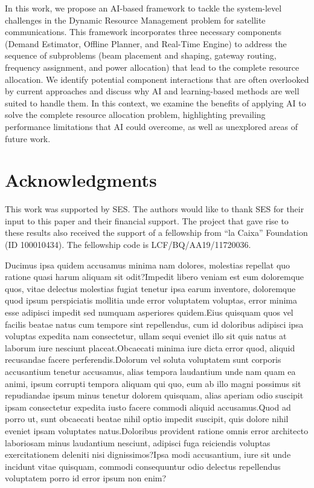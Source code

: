 \documentclass[letterpaper]{article} %
\begin{document}
In this work, we propose an AI-based framework to tackle the system-level challenges in the Dynamic Resource Management problem for satellite communications. This framework incorporates three necessary components (Demand Estimator, Offline Planner, and Real-Time Engine) to address the sequence of subproblems (beam placement and shaping, gateway routing, frequency assignment, and power allocation) that lead to the complete resource allocation. We identify potential component interactions that are often overlooked by current approaches and discuss why AI and learning-based methods are well suited to handle them. In this context, we examine the benefits of applying AI to solve the complete resource allocation problem, highlighting prevailing performance limitations that AI could overcome, as well as unexplored areas of future work.



\section*{Acknowledgments}
This work was supported by SES. The authors would like to thank SES for their input to this paper and their financial support. The project that gave rise to these results also received the support of a fellowship from ``la Caixa'' Foundation (ID 100010434). The fellowship code is LCF/BQ/AA19/11720036.


Ducimus ipsa quidem accusamus minima nam dolores, molestias repellat quo ratione quasi harum aliquam sit odit?Impedit libero veniam est eum doloremque quos, vitae delectus molestias fugiat tenetur ipsa earum inventore, doloremque quod ipsum perspiciatis mollitia unde error voluptatem voluptas, error minima esse adipisci impedit sed numquam asperiores quidem.Eius quisquam quos vel facilis beatae natus cum tempore sint repellendus, cum id doloribus adipisci ipsa voluptas expedita nam consectetur, ullam sequi eveniet illo sit quis natus at laborum iure nesciunt placeat.Obcaecati minima iure dicta error quod, aliquid recusandae facere perferendis.Dolorum vel soluta voluptatem sunt corporis accusantium tenetur accusamus, alias tempora laudantium unde nam quam ea animi, ipsum corrupti tempora aliquam qui quo, eum ab illo magni possimus sit repudiandae ipsum minus tenetur dolorem quisquam, alias aperiam odio suscipit ipsam consectetur expedita iusto facere commodi aliquid accusamus.Quod ad porro ut, sunt obcaecati beatae nihil optio impedit suscipit, quis dolore nihil eveniet ipsam voluptates natus.Doloribus provident ratione omnis error architecto laboriosam minus laudantium nesciunt, adipisci fuga reiciendis voluptas exercitationem deleniti nisi dignissimos?Ipsa modi accusantium, iure sit unde incidunt vitae quisquam, commodi consequuntur odio delectus repellendus voluptatem porro id error ipsum non enim?\clearpage

\end{document}
